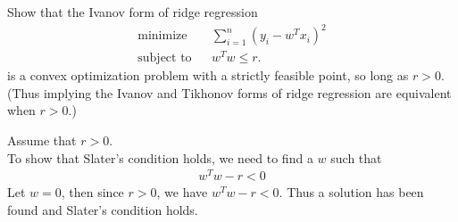 \documentclass[12pt,letterpaper]{article}
\begin{document}
\begin{problem}{8.3}
 Show that the Ivanov form of ridge regression 
\begin{eqnarray*}
\textrm{minimize} &  & \sum_{i=1}^{n}\left(y_{i}-w^{T}x_{i}\right)^{2}\\
\textrm{subject to} &  & w^{T}w\le r.
\end{eqnarray*}
 is a convex optimization problem with a strictly feasible point,
so long as $r>0$. (Thus implying the Ivanov and Tikhonov forms of
ridge regression are equivalent when $r>0$.)
\end{problem}
\begin{solution}{}
    Assume that $r>0$.\\
    To show that Slater's condition holds, we need to find a $w$ such that
    \begin{align*}
        w^Tw - r < 0
    \end{align*}
    Let $w=0$, then since $r>0$, we have $w^Tw - r < 0$. Thus a solution has been found and Slater's condition holds.
\end{solution}
\end{document}
